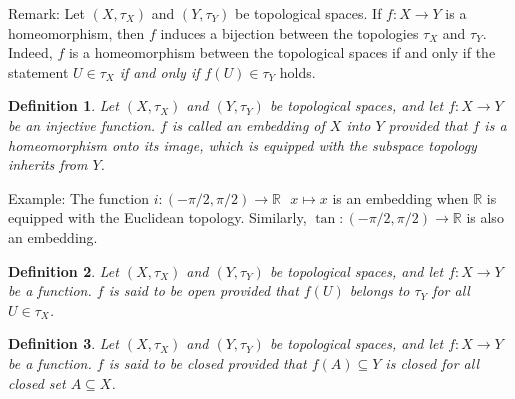 \documentclass[11pt]{book}
\theoremstyle{break}
\theoremstyle{break}
\newtheorem{defn}{Definition}[corL]
\newcommand{\R}{\mathbb{R}}
\newcommand{\remark}{\color{blue}Remark: \color{black}}
\newcommand{\example}{\color{green}Example: \color{black}}
\begin{document}
\remark Let $(X,\tau_X)$ and $(Y,\tau_Y)$ be topological spaces. If $f:X\to Y$ is a homeomorphism, then $f$ induces a bijection between the topologies $\tau_X$ and $\tau_Y$.  Indeed, $f$ is a homeomorphism between the topological spaces if and only if the statement \textit{$U\in \tau_X$ if and only if $f(U) \in \tau_Y$} holds. \\

\begin{defn}
Let $(X,\tau_X)$ and $(Y,\tau_Y)$ be topological spaces, and let $f:X \to Y$ be an injective function. $f$ is called an embedding of $X$ into $Y$ provided that $f$ is a homeomorphism onto its image, which is equipped with the subspace topology inherits from $Y$.
\end{defn}

\example The function $i:(-\pi/2, \pi/2)\to \R \ \ \ x\mapsto x$ is an embedding when $\R$ is equipped with the Euclidean topology. Similarly, $\tan:(-\pi/2, \pi/2)\to \R$ is also an embedding. \\

\begin{defn}
Let $(X,\tau_X)$ and $(Y,\tau_Y)$ be topological spaces, and let $f:X \to Y$ be a function. $f$ is said to be open provided that $f(U)$ belongs to $\tau_Y$ for all $U \in \tau_X$.
\end{defn}

\begin{defn}
Let $(X,\tau_X)$ and $(Y,\tau_Y)$ be topological spaces, and let $f:X \to Y$ be a function. $f$ is said to be closed provided that $f(A)\subseteq Y$ is closed for all closed set $A \subseteq X$. 
\end{defn}
\end{document}
